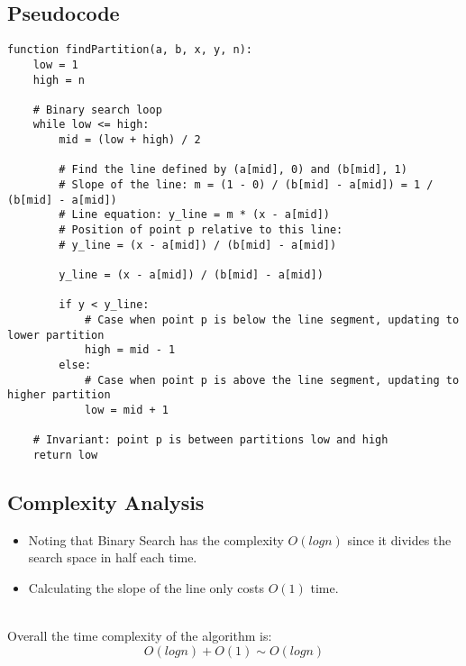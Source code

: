 \documentclass{article}
\begin{document}
\subsection*{Pseudocode}
\begin{verbatim}
function findPartition(a, b, x, y, n):
    low = 1
    high = n

    # Binary search loop
    while low <= high:
        mid = (low + high) / 2

        # Find the line defined by (a[mid], 0) and (b[mid], 1)
        # Slope of the line: m = (1 - 0) / (b[mid] - a[mid]) = 1 / (b[mid] - a[mid])
        # Line equation: y_line = m * (x - a[mid])
        # Position of point p relative to this line: 
        # y_line = (x - a[mid]) / (b[mid] - a[mid])
        
        y_line = (x - a[mid]) / (b[mid] - a[mid])

        if y < y_line:
            # Case when point p is below the line segment, updating to lower partition
            high = mid - 1 
        else:
            # Case when point p is above the line segment, updating to higher partition
            low = mid + 1

    # Invariant: point p is between partitions low and high
    return low

\end{verbatim}

\subsection*{Complexity Analysis}
\begin{itemize}
    \item Noting that Binary Search has the complexity $O(logn)$ since it divides the search space in half each time.
    \item Calculating the slope of the line only costs $O(1)$ time.
\end{itemize}
\\
Overall the time complexity of the algorithm is:
\[ O(logn) + O(1) \sim O(logn) \]
\end{document}
